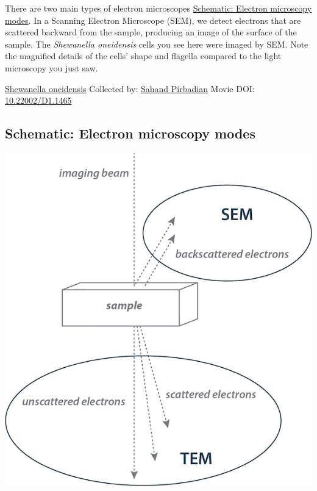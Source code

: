 \documentclass[]{tufte-book}
\begin{document}
There are two main types of electron microscopes \protect\hyperlink{Electron_microscopy_modes}{Schematic: Electron microscopy modes}. In a Scanning Electron Microscope (SEM), we detect electrons that are scattered backward from the sample, producing an image of the surface of the sample. The \emph{Shewanella oneidensis} cells you see here were imaged by SEM. Note the magnified details of the cells' shape and flagella compared to the light microscopy you just saw.



\hypertarget{htmlwidget-74f8fc0e4c8500e4b5b1}{}

\label{fig:1-3}\protect\hyperlink{tree}{Shewanella oneidensis} Collected by: \protect\hyperlink{sahand_pirbadian}{Sahand Pirbadian} Movie DOI: \href{https://doi.org/10.22002/D1.1465}{10.22002/D1.1465}

\hypertarget{Electron_microscopy_modes}{%
\subsection*{Schematic: Electron microscopy modes}\label{Electron_microscopy_modes}}

\includegraphics[width=8.33in]{img/schematics/1_3_1}
\end{document}
